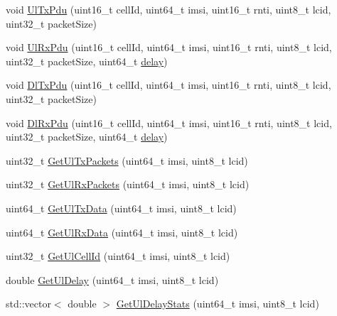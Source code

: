 \begin{DoxyCompactItemize}
\item 
void \hyperlink{classns3_1_1RadioBearerStatsCalculator_a7d2faeb0169ea5f6adfb630bf7894170}{Ul\+Tx\+Pdu} (uint16\+\_\+t cell\+Id, uint64\+\_\+t imsi, uint16\+\_\+t rnti, uint8\+\_\+t lcid, uint32\+\_\+t packet\+Size)
\item 
void \hyperlink{classns3_1_1RadioBearerStatsCalculator_a6a79f14f933f8da8093439b8675419ef}{Ul\+Rx\+Pdu} (uint16\+\_\+t cell\+Id, uint64\+\_\+t imsi, uint16\+\_\+t rnti, uint8\+\_\+t lcid, uint32\+\_\+t packet\+Size, uint64\+\_\+t \hyperlink{mmwave_2model_2fading-traces_2fading__trace__generator_8m_a7964e6aa8f61a9d28973c8267a606ad8}{delay})
\item 
void \hyperlink{classns3_1_1RadioBearerStatsCalculator_a920ab769b5eab19c5818a3d48325cd8a}{Dl\+Tx\+Pdu} (uint16\+\_\+t cell\+Id, uint64\+\_\+t imsi, uint16\+\_\+t rnti, uint8\+\_\+t lcid, uint32\+\_\+t packet\+Size)
\item 
void \hyperlink{classns3_1_1RadioBearerStatsCalculator_a99b934bd7860d098ec4665113ad016a1}{Dl\+Rx\+Pdu} (uint16\+\_\+t cell\+Id, uint64\+\_\+t imsi, uint16\+\_\+t rnti, uint8\+\_\+t lcid, uint32\+\_\+t packet\+Size, uint64\+\_\+t \hyperlink{mmwave_2model_2fading-traces_2fading__trace__generator_8m_a7964e6aa8f61a9d28973c8267a606ad8}{delay})
\item 
uint32\+\_\+t \hyperlink{classns3_1_1RadioBearerStatsCalculator_adda2177219a76bd981c6f4b555308027}{Get\+Ul\+Tx\+Packets} (uint64\+\_\+t imsi, uint8\+\_\+t lcid)
\item 
uint32\+\_\+t \hyperlink{classns3_1_1RadioBearerStatsCalculator_a145c48f6328cea329657127940cb61a0}{Get\+Ul\+Rx\+Packets} (uint64\+\_\+t imsi, uint8\+\_\+t lcid)
\item 
uint64\+\_\+t \hyperlink{classns3_1_1RadioBearerStatsCalculator_a9445f98e5497ecfe753ef033ea13c76f}{Get\+Ul\+Tx\+Data} (uint64\+\_\+t imsi, uint8\+\_\+t lcid)
\item 
uint64\+\_\+t \hyperlink{classns3_1_1RadioBearerStatsCalculator_a6ce5113218813509a6fb6159f9be4807}{Get\+Ul\+Rx\+Data} (uint64\+\_\+t imsi, uint8\+\_\+t lcid)
\item 
uint32\+\_\+t \hyperlink{classns3_1_1RadioBearerStatsCalculator_a22c3a359fc34f3143bbdbe1542ac1de7}{Get\+Ul\+Cell\+Id} (uint64\+\_\+t imsi, uint8\+\_\+t lcid)
\item 
double \hyperlink{classns3_1_1RadioBearerStatsCalculator_abda9550e5c9fa50150cb4bd75b4a92b0}{Get\+Ul\+Delay} (uint64\+\_\+t imsi, uint8\+\_\+t lcid)
\item 
std\+::vector$<$ double $>$ \hyperlink{classns3_1_1RadioBearerStatsCalculator_ae3a37fab9714d2f08c94a0704d37d762}{Get\+Ul\+Delay\+Stats} (uint64\+\_\+t imsi, uint8\+\_\+t lcid)

\end{DoxyCompactItemize}
